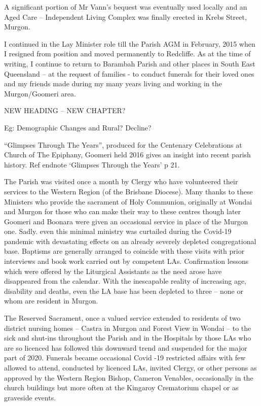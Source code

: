 A significant portion of Mr Vann's bequest was eventually used locally
and an Aged Care -- Independent Living Complex was finally erected in
Krebs Street, Murgon.

I continued in the Lay Minister role till the Parish AGM in February,
2015 when I resigned from position and moved permanently to Redcliffe.
As at the time of writing, I continue to return to Barambah Parish and
other places in South East Queensland -- at the request of families - to
conduct funerals for their loved ones and my friends made during my many
years living and working in the Murgon/Goomeri area.

NEW HEADING -- NEW CHAPTER?

Eg: Demographic Changes and Rural? Decline?

``Glimpses Through The Years'', produced for the Centenary Celebrations
at Church of The Epiphany, Goomeri held 2016 gives an insight into
recent parish history. Ref endnote `Glimpses Through the Years' p 21.

The Parish was visited once a month by Clergy who have volunteered their
services to the Western Region (of the Brisbane Diocese). Many thanks to
these Ministers who provide the sacrament of Holy Communion, originally
at Wondai and Murgon for those who can make their way to these centres
though later Goomeri and Boonara were given an occasional service in
place of the Murgon one. Sadly. even this minimal ministry was curtailed
during the Covid-19 pandemic with devastating effects on an already
severely depleted congregational base. Baptisms are generally arranged
to coincide with these visits with prior interviews and book work
carried out by competent LAs. Confirmation lessons which were offered by
the Liturgical Assistants as the need arose have disappeared from the
calendar. With the inescapable reality of increasing age, disability and
deaths, even the LA base has been depleted to three -- none or whom are
resident in Murgon.

The Reserved Sacrament, once a valued service extended to residents of
two district nursing homes -- Castra in Murgon and Forest View in Wondai
-- to the sick and shut-ins throughout the Parish and in the Hospitals
by those LAs who are so licenced has followed this downward trend and
suspended for the major part of 2020. Funerals became occasional Covid
-19 restricted affairs with few allowed to attend, conducted by licenced
LAs, invited Clergy, or other persons as approved by the Western Region
Bishop, Cameron Venables, occasionally in the church buildings but more
often at the Kingaroy Crematorium chapel or as graveside events.

